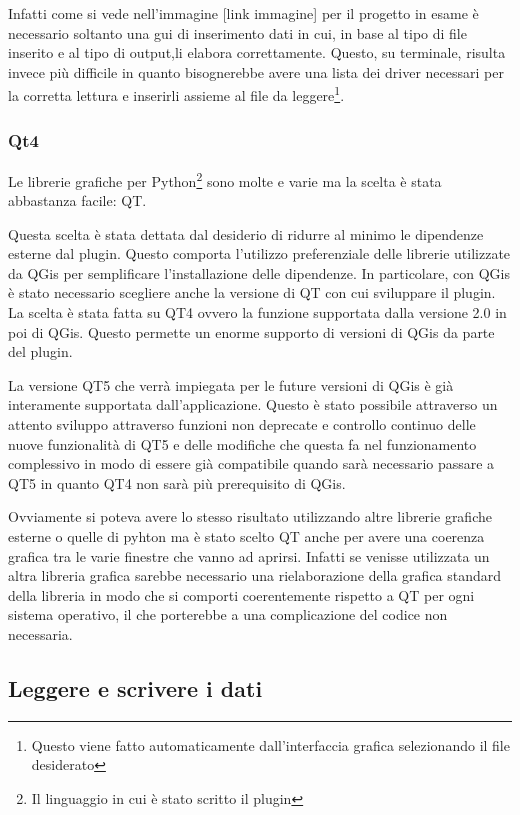 
Infatti come si vede nell'immagine [link immagine] per il progetto in esame è necessario soltanto una gui di inserimento dati in cui, in base al tipo di file inserito e al tipo di output,li elabora correttamente. Questo, su terminale, risulta invece più difficile in quanto bisognerebbe avere una lista dei driver necessari per la corretta lettura e inserirli assieme al file da leggere\footnote{Questo viene fatto automaticamente dall'interfaccia grafica selezionando il file desiderato}.

\subsubsection{Qt4}

Le librerie grafiche per Python\footnote{Il linguaggio in cui è stato scritto il plugin} sono molte e varie ma la scelta è stata abbastanza facile: QT.

Questa scelta è stata dettata dal desiderio di ridurre al minimo le dipendenze esterne dal plugin. Questo comporta l'utilizzo preferenziale delle librerie utilizzate da QGis per semplificare l'installazione delle dipendenze. In particolare, con QGis è stato necessario scegliere anche la versione di QT con cui sviluppare il plugin. La scelta è stata fatta su QT4 ovvero la funzione supportata dalla versione 2.0 in poi di QGis.  Questo permette un enorme supporto di versioni di QGis da parte del plugin. 

La versione QT5 che verrà impiegata per le future versioni di QGis è già interamente supportata dall'applicazione. Questo è stato possibile attraverso un attento sviluppo attraverso funzioni non deprecate e controllo continuo delle nuove funzionalità di QT5 e delle modifiche che questa fa nel funzionamento complessivo in modo di essere già compatibile quando sarà necessario passare a QT5 in quanto QT4 non sarà più prerequisito di QGis.

Ovviamente si poteva avere lo stesso risultato utilizzando altre librerie grafiche esterne o quelle di pyhton ma è stato scelto QT anche per avere una coerenza grafica tra le varie finestre che vanno ad aprirsi. Infatti se venisse utilizzata un altra libreria grafica sarebbe necessario una rielaborazione della grafica standard della libreria in modo che si comporti coerentemente rispetto a QT per ogni sistema operativo, il che porterebbe a una complicazione del codice non necessaria.

\subsection{Leggere e scrivere i dati}

